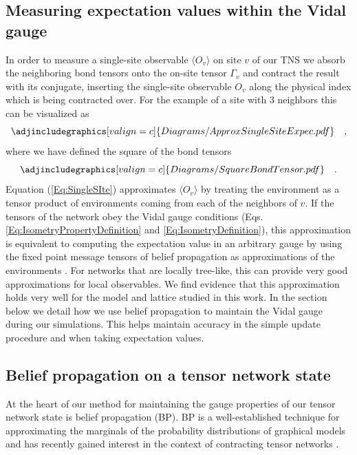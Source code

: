 \documentclass[%
 superscriptaddress,
 amsmath,amssymb,
 prx, nofootinbib,
]{revtex4-2}
\begin{document}
\subsection*{Measuring expectation values within the Vidal gauge}
In order to measure a single-site observable $\langle O_{v} \rangle$ on site $v$ of our TNS we absorb the neighboring bond tensors onto the on-site tensor $\Gamma_{v}$ and contract the result with its conjugate, inserting the single-site observable $O_{v}$ along the physical index which is being contracted over.
For the example of a site with $3$ neighbors this can be visualized as
\begin{equation}
    \adjincludegraphics[valign=c]{Diagrams/ApproxSingleSiteExpec.pdf} \quad,
    \label{Eq:SingleSIte}
\end{equation}
where we have defined the square of the bond tensors
\begin{equation}
    \adjincludegraphics[valign=c]{Diagrams/SquareBondTensor.pdf} \quad.
    \label{Eq:SquareBondTensors}
\end{equation}
Equation (\ref{Eq:SingleSIte}) approximates $\langle O_{v} \rangle$ by treating the environment as a tensor product of environments coming from each of the neighbors of $v$. If the tensors of the network obey the Vidal gauge conditions (Eqs. \ref{Eq:IsometryPropertyDefinition} and \ref{Eq:IsometryDefinition}), this approximation is equivalent to computing the expectation value in an arbitrary gauge by using the fixed point message tensors of belief propagation as approximations of the environments \cite{Alkabetz2021, TindallGauging2023}. For networks that are locally tree-like, this can provide very good approximations for local observables. We find evidence that this approximation holds very well for the model and lattice studied in this work.
In the section below we detail how we use belief propagation to maintain the Vidal gauge during our simulations. This helps maintain accuracy in the simple update procedure and when taking expectation values. 


\subsection*{Belief propagation on a tensor network state}
At the heart of our method for maintaining the gauge properties of our tensor network state is belief propagation (BP). BP is a well-established technique for approximating the marginals of the probability distributions of graphical models \cite{BeliefPropagation1} and has recently gained interest in the context of contracting tensor networks \cite{TensorNetworkBeliefPropagation1,TensorNetworkBeliefPropagation2,TensorNetworkBeliefPropagation3,SimpleUpdateGauging3}. 
\end{document}
